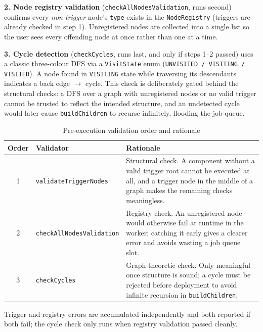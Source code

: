 \textbf{2. Node registry validation} (\texttt{checkAllNodesValidation}, runs
second) confirms every \textit{non-trigger} node's \texttt{type} exists in the
\texttt{NodeRegistry} (triggers are already checked in step 1). Unregistered
nodes are collected into a single list so the user sees every offending node
at once rather than one at a time.

\textbf{3. Cycle detection} (\texttt{checkCycles}, runs last, and only if
steps 1--2 passed) uses a classic three-colour DFS via a \texttt{VisitState}
enum (\texttt{UNVISITED / VISITING / VISITED}). A node found in
\texttt{VISITING} state while traversing its descendants indicates a back
edge $\rightarrow$ cycle. This check is deliberately gated behind the
structural checks: a DFS over a graph with unregistered nodes or no valid
trigger cannot be trusted to reflect the intended structure, and an
undetected cycle would later cause \texttt{buildChildren} to recurse
infinitely, flooding the job queue.

\begin{table}[h!]
\centering
\begin{tabular}{clp{7.5cm}}
  \toprule
  \textbf{Order} & \textbf{Validator} & \textbf{Rationale} \\
  \midrule
  1 & \texttt{validateTriggerNodes}   &
      Structural check. A component without a valid trigger root cannot be
      executed at all, and a trigger node in the middle of a graph makes the
      remaining checks meaningless. \\[6pt]
  2 & \texttt{checkAllNodesValidation} &
      Registry check. An unregistered node would otherwise fail at runtime in
      the worker; catching it early gives a clearer error and avoids wasting
      a job queue slot. \\[6pt]
  3 & \texttt{checkCycles} &
      Graph-theoretic check. Only meaningful once structure is sound; a cycle
      must be rejected before deployment to avoid infinite recursion in
      \texttt{buildChildren}. \\
  \bottomrule
\end{tabular}
\caption{Pre-execution validation order and rationale}
\label{tab:validation-order-summary}
\end{table}

Trigger and registry errors are accumulated independently and both reported
if both fail; the cycle check only runs when registry validation passed
cleanly.
